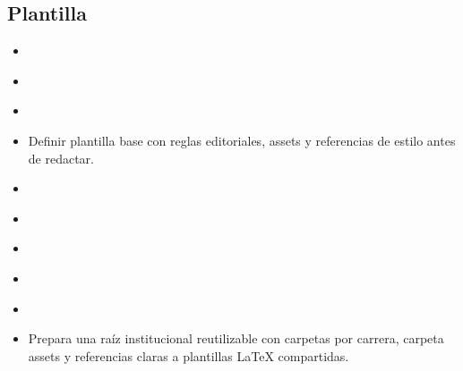 \documentclass[12pt]{article}
\begin{document}
\subsection*{Plantilla}
\begin{itemize}[leftmargin=*]
  \item \\%
  \item \\%
  \item \\%
  \item Definir plantilla base con reglas editoriales, assets y referencias de estilo antes de redactar.
  \item \\%
  \item \\%
  \item \\%
  \item \\%
  \item \\%
  \item Prepara una raíz institucional reutilizable con carpetas por carrera, carpeta assets y referencias claras a plantillas LaTeX compartidas.

\end{itemize}
\end{document}
